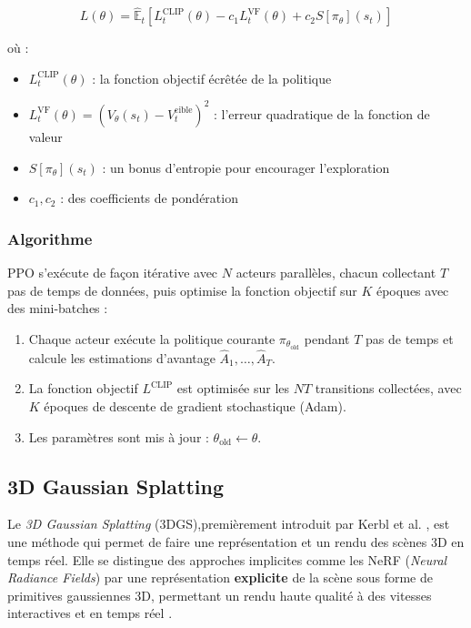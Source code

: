 \begin{equation}
    L(\theta) = \hat{\mathbb{E}}_t \left[ 
    L^{\text{CLIP}}_t(\theta) - c_1 L^{\text{VF}}_t(\theta) 
    + c_2 S[\pi_\theta](s_t) \right]
    \label{eq:ppo_full}
\end{equation}

où :
\begin{itemize}[noitemsep, topsep=4pt]
    \item $L^{\text{CLIP}}_t(\theta)$ : la fonction objectif écrêtée de la 
    politique
    \item $L^{\text{VF}}_t(\theta) = (V_\theta(s_t) - V_t^{\text{cible}})^2$ 
    : l'erreur quadratique de la fonction de valeur
    \item $S[\pi_\theta](s_t)$ : un bonus d'entropie pour encourager 
    l'exploration
    \item $c_1, c_2$ : des coefficients de pondération
\end{itemize}

\subsubsection*{Algorithme}

PPO s'exécute de façon itérative avec $N$ acteurs parallèles, chacun 
collectant $T$ pas de temps de données, puis optimise la fonction objectif 
sur $K$ époques avec des mini-batches :

\begin{enumerate}[noitemsep, topsep=4pt]
    \item Chaque acteur exécute la politique courante $\pi_{\theta_{\text{old}}}$ 
    pendant $T$ pas de temps et calcule les estimations d'avantage 
    $\hat{A}_1, \ldots, \hat{A}_T$.
    \item La fonction objectif $L^{\text{CLIP}}$ est optimisée sur les $NT$ 
    transitions collectées, avec $K$ époques de descente de gradient 
    stochastique (Adam).
    \item Les paramètres sont mis à jour : $\theta_{\text{old}} \leftarrow \theta$.
\end{enumerate}





\subsection{3D Gaussian Splatting}

Le \textit{3D Gaussian Splatting} (3DGS),premièrement introduit par Kerbl et al. \cite{ref5}, est une méthode qui permet de faire une représentation et un rendu des scènes 3D en temps réel. Elle se distingue des approches implicites comme les NeRF (\textit{Neural Radiance Fields}) par une représentation \textbf{explicite} de la scène sous forme de primitives gaussiennes 3D, permettant un rendu haute qualité à des vitesses interactives et en temps réel .


